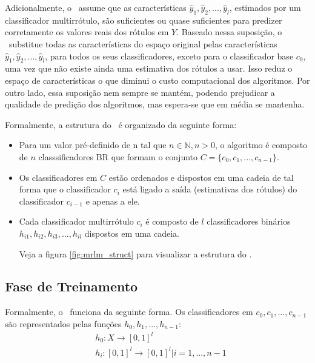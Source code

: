  Adicionalmente, o \MRLMa~assume que as características $\hat{y}_1,\hat{y}_2,...,\hat{y}_l$, estimados por um classificador multirrótulo,
 são suficientes ou quase suficientes para predizer corretamente os valores reais dos rótulos em $Y$.
 Baseado nessa suposição, o \MRLMa~substitue todas as características do espaço original pelas características $\hat{y}_1,\hat{y}_2,...,\hat{y}_l$,
 para todos os seus classificadores, exceto para o classificador base $c_0$, uma vez que não existe ainda uma estimativa dos rótulos a usar.
 Isso reduz o espaço de características o que diminui o custo computacional dos algoritmos.
 Por outro lado, essa suposição nem sempre se mantém, podendo prejudicar a qualidade de predição dos algoritmos, mas espera-se que em média se mantenha.
 
 Formalmente, a estrutura do \MRLMa~é organizado da seguinte forma:
 \begin{itemize}
  \item Para um valor pré-definido de n tal que $n\in \mathbb{N}, n>0$, o algoritmo é composto de
  $n$ classsificadores BR que formam o conjunto $C=\{c_0,c_1,...,c_{n-1}\}$. 
  \item Os classificadores em $C$ estão ordenados e dispostos em uma cadeia de tal forma que o 
  classificador $c_i$ está ligado a saída (estimativas dos rótulos) do classificador $c_{i-1}$ e apenas a ele.
  \item Cada classificador multirrótulo $c_i$ é composto de $l$ classificadores binários $h_{i1},h_{i2},h_{i3},...,h_{il}$
  dispostos em uma cadeia.
  
  
  Veja a figura \ref{fig:mrlm_struct} para visualizar a estrutura do \MRLMa.
  
  
  
  
 \end{itemize}

 
 
 \subsection{Fase de Treinamento}
 
 Formalmente, o \MRLMa~funciona da seguinte forma. Os classificadores em $c_0,c_1,...,c_{n-1}$ são representados
 pelas funções $h_0,h_1,...,h_{n-1}$:
 \begin{equation}
 \begin{split}
    & h_0 : X \rightarrow [0,1]^l \\
    & h_i : [0,1]^l \rightarrow [0,1]^l | i=1,...,n-1
  \end{split}
 \end{equation}
 
